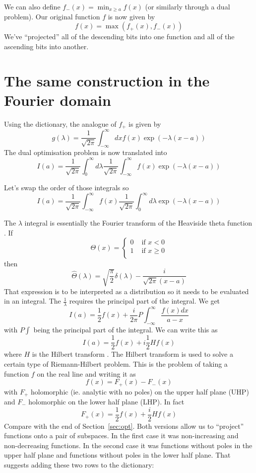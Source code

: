 \documentclass[10pt]{article}
\begin{document}
We can also define $f_-(x)=\min_{x\ge a}f(x)$ (or similarly through a dual problem).
Our original function $f$ is now given by
\[
f(x)=\max(f_+(x),f_-(x))
\]
We've ``projected'' all of the descending bits into one function and all of the ascending bits into another.

%
%
\section{The same construction in the Fourier domain}
Using the dictionary, the analogue of $f_+$ is given by
\[
g(\lambda)=\frac{1}{\sqrt{2\pi}}\int_{-\infty}^{\infty}dxf(x)\exp(-\lambda(x-a))
\]
The dual optimisation problem is now translated into
\[
I(a)=\frac{1}{\sqrt{2\pi}}\int_0^\infty d\lambda\frac{1}{\sqrt{2\pi}}\int_{-\infty}^{\infty}f(x)\exp(-\lambda(x-a))
\]

Let's swap the order of those integrals so
\[
I(a)=\frac{1}{\sqrt{2\pi}}\int_{-\infty}^{\infty}f(x)\frac{1}{\sqrt{2\pi}}\int_0^\infty d\lambda\exp(-\lambda(x-a))
\]

The $\lambda$ integral is essentially the Fourier transform of the Heaviside theta function \cite{htheta}.
If
\[
\Theta(x) = \begin{cases}
0 & \mbox{ if }x<0 \\
1 & \mbox{ if }x\ge 0 \\
\end{cases}
\]
then
\[
\hat{\Theta}(\lambda)=\sqrt{\frac{\pi}{2}}\delta(\lambda)-\frac{i}{\sqrt{2\pi}(x-a)}
\]
That expression is to be interpreted as a distribution so it needs to be evaluated in an integral. The $\frac{1}{\lambda}$ requires the principal part of the integral.
We get
\[
I(a)=\frac{1}{2}f(x)+\frac{i}{2\pi}P\!\int_{-\infty}^\infty\frac{f(x)dx}{a-x}
\]
with $P\!\int$ being the principal part of the integral.
We can write this as
\[
I(a) = \frac{1}{2}f(x)+i\frac{1}{2}Hf(x)
\]
where $H$ is the Hilbert transform \cite{hilbert}.
The Hilbert transform is used to solve a certain type of Riemann-Hilbert \cite{rh} problem.
This is the problem of taking a function $f$ on the real line and writing it as
\[
f(x)=F_+(x)-F_-(x)
\]
with $F_+$ holomorphic (ie. analytic with no poles) on the upper half plane (UHP) and $F_-$ holomorphic on the lower half plane (LHP).
In fact
\[
F_+(x) = \frac{1}{2}f(x)+\frac{i}{2}Hf(x)
\]
Compare with the end of Section~\ref{sec:opt}.
Both versions allow us to ``project'' functions onto a pair of subspaces.
In the first case it was non-increasing and non-decreasing functions.
In the second case it was functions without poles in the upper half plane and functions without poles in the lower half plane.
That suggests adding these two rows to the dictionary:
\end{document}
